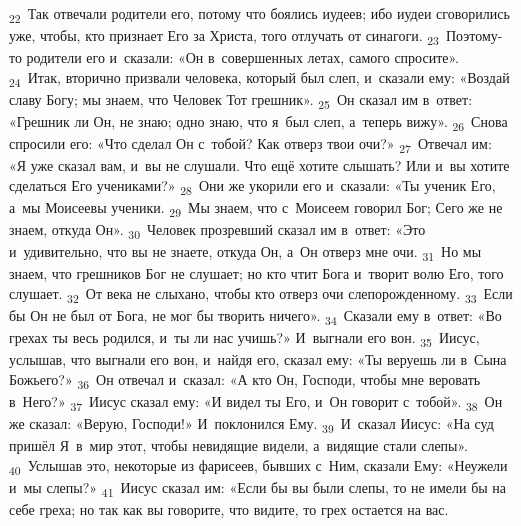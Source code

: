 \documentclass[a4paper,12pt]{article}
\begin{document}
\textsubscript{22}~Так отвечали родители его, потому что боялись иудеев; ибо иудеи сговорились уже, чтобы, кто признает Его за Христа, того отлучать от синагоги.
\textsubscript{23}~Поэтому-то родители его и~сказали: «Он в~совершенных летах, самого спросите».
\textsubscript{24}~Итак, вторично призвали человека, который был слеп, и~сказали ему: «Воздай славу Богу; мы знаем, что Человек Тот грешник».
\textsubscript{25}~Он сказал им в~ответ: «Грешник ли Он, не знаю; одно знаю, что я~был слеп, а~теперь вижу».
\textsubscript{26}~Снова спросили его: «Что сделал Он с~тобой? Как отверз твои очи?»
\textsubscript{27}~Отвечал им: «Я уже сказал вам, и~вы не слушали. Что ещё хотите слышать? Или и~вы хотите сделаться Его учениками?»
\textsubscript{28}~Они же укорили его и~сказали: «Ты ученик Его, а~мы Моисеевы ученики.
\textsubscript{29}~Мы знаем, что с~Моисеем говорил Бог; Сего же не знаем, откуда Он».
\textsubscript{30}~Человек прозревший сказал им в~ответ: «Это и~удивительно, что вы не знаете, откуда Он, а~Он отверз мне очи.
\textsubscript{31}~Но мы знаем, что грешников Бог не слушает; но кто чтит Бога и~творит волю Его, того слушает.
\textsubscript{32}~От века не слыхано, чтобы кто отверз очи слепорожденному.
\textsubscript{33}~Если бы Он не был от Бога, не мог бы творить ничего».
\textsubscript{34}~Сказали ему в~ответ: «Во грехах ты весь родился, и~ты ли нас учишь?» И~выгнали его вон.
\textsubscript{35}~Иисус, услышав, что выгнали его вон, и~найдя его, сказал ему: «Ты веруешь ли в~Сына Божьего?»
\textsubscript{36}~Он отвечал и~сказал: «А кто Он, Господи, чтобы мне веровать в~Него?»
\textsubscript{37}~Иисус сказал ему: «И видел ты Его, и~Он говорит с~тобой».
\textsubscript{38}~Он же сказал: «Верую, Господи!» И~поклонился Ему.
\textsubscript{39}~И~сказал Иисус: «На суд пришёл Я~в~мир этот, чтобы невидящие видели, а~видящие стали слепы».
\textsubscript{40}~Услышав это, некоторые из фарисеев, бывших с~Ним, сказали Ему: «Неужели и~мы слепы?»
\textsubscript{41}~Иисус сказал им: «Если бы вы были слепы, то не имели бы на себе греха; но так как вы говорите, что видите, то грех остается на вас. 
\end{document}
